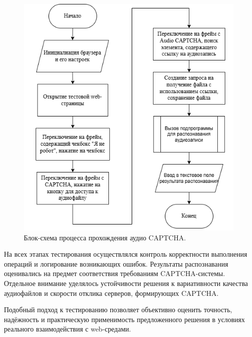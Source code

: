\begin{figure}[H]
    \centering
    \includegraphics[width=0.55\linewidth]{imgs/audiocaptcha/captcha_solve.png}
    \caption{Блок-схема процесса прохождения аудио CAPTCHA.}
    \label{fig:audio-solver}
\end{figure}
\vspace{-0.85cm}

На всех этапах тестирования осуществлялся контроль корректности выполнения 
операций и логирование возникающих ошибок. Результаты распознавания оценивались 
на предмет соответствия требованиям CAPTCHA-системы. Отдельное внимание уделялось 
устойчивости решения к вариативности качества аудиофайлов и скорости отклика 
серверов, формирующих CAPTCHA.

Подобный подход к тестированию позволяет объективно оценить точность, надёжность 
и практическую применимость предложенного решения в условиях реального 
взаимодействия с web-средами.
